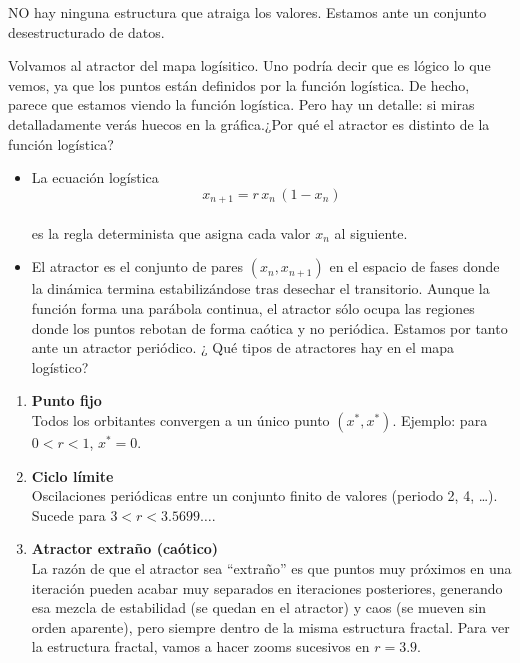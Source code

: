\documentclass[
  11pt,
  a4paper,
  DIV=11,
  numbers=noendperiod]{scrreprt}
\providecommand{\tightlist}{%
  \setlength{\itemsep}{0pt}\setlength{\parskip}{0pt}}
\begin{document}
NO hay ninguna estructura que atraiga los valores. Estamos ante un
conjunto desestructurado de datos.

Volvamos al atractor del mapa logísitico. Uno podría decir que es lógico
lo que vemos, ya que los puntos están definidos por la función
logística. De hecho, parece que estamos viendo la función logística.
Pero hay un detalle: si miras detalladamente verás huecos en la
gráfica.¿Por qué el atractor es distinto de la función logística?

\begin{itemize}
\tightlist
\item
  La ecuación logística\\
  \[
  x_{n+1} = r\,x_n\,(1 - x_n)
  \]\\
  es la regla determinista que asigna cada valor \(x_n\) al siguiente.
\item
  El atractor es el conjunto de pares \((x_n, x_{n+1})\) en el espacio
  de fases donde la dinámica termina estabilizándose tras desechar el
  transitorio. Aunque la función forma una parábola continua, el
  atractor sólo ocupa las regiones donde los puntos rebotan de forma
  caótica y no periódica. Estamos por tanto ante un atractor periódico.
  ¿ Qué tipos de atractores hay en el mapa logístico?
\end{itemize}

\begin{enumerate}
\def\labelenumi{\arabic{enumi}.}
\item
  \textbf{Punto fijo}\\
  Todos los orbitantes convergen a un único punto \((x^*,x^*)\).
  Ejemplo: para \(0 < r < 1\), \(x^* = 0\).
\item
  \textbf{Ciclo límite}\\
  Oscilaciones periódicas entre un conjunto finito de valores (periodo
  2, 4, \ldots). Sucede para \(3 < r < 3.5699\ldots\).
\item
  \textbf{Atractor extraño (caótico)}\\
  La razón de que el atractor sea ``extraño'' es que puntos muy próximos
  en una iteración pueden acabar muy separados en iteraciones
  posteriores, generando esa mezcla de estabilidad (se quedan en el
  atractor) y caos (se mueven sin orden aparente), pero siempre dentro
  de la misma estructura fractal. Para ver la estructura fractal, vamos
  a hacer zooms sucesivos en \(r = 3.9\).
\end{enumerate}
\end{document}
